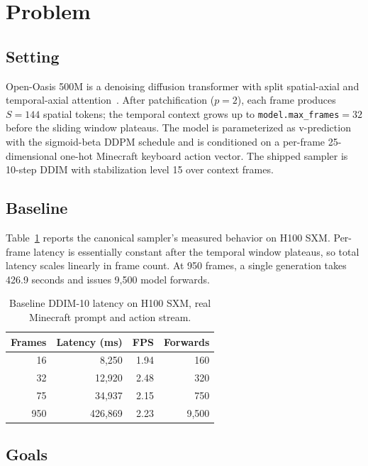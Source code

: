 \documentclass[10pt,letterpaper,twocolumn]{article}
\begin{document}
\section{Problem}

\subsection{Setting}

Open-Oasis 500M is a denoising diffusion transformer with split spatial-axial and temporal-axial attention~\citep{etched2024oasis}. After patchification ($p=2$), each frame produces $S=144$ spatial tokens; the temporal context grows up to \texttt{model.max\_frames}$=32$ before the sliding window plateaus. The model is parameterized as v-prediction with the sigmoid-beta DDPM schedule and is conditioned on a per-frame 25-dimensional one-hot Minecraft keyboard action vector. The shipped sampler is 10-step DDIM with stabilization level 15 over context frames.

\subsection{Baseline}

Table~\ref{tab:baseline} reports the canonical sampler's measured behavior on H100 SXM. Per-frame latency is essentially constant after the temporal window plateaus, so total latency scales linearly in frame count. At 950 frames, a single generation takes 426.9 seconds and issues 9{,}500 model forwards.

\begin{table}[t]
\caption{Baseline DDIM-10 latency on H100 SXM, real Minecraft prompt and action stream.}
\label{tab:baseline}
\centering\small
\begin{tabular}{rrrr}
\toprule
Frames & Latency (ms) & FPS & Forwards \\
\midrule
16   & 8{,}250   & 1.94 & 160 \\
32   & 12{,}920  & 2.48 & 320 \\
75   & 34{,}937  & 2.15 & 750 \\
950  & 426{,}869 & 2.23 & 9{,}500 \\
\bottomrule
\end{tabular}
\end{table}

\subsection{Goals}
\end{document}
